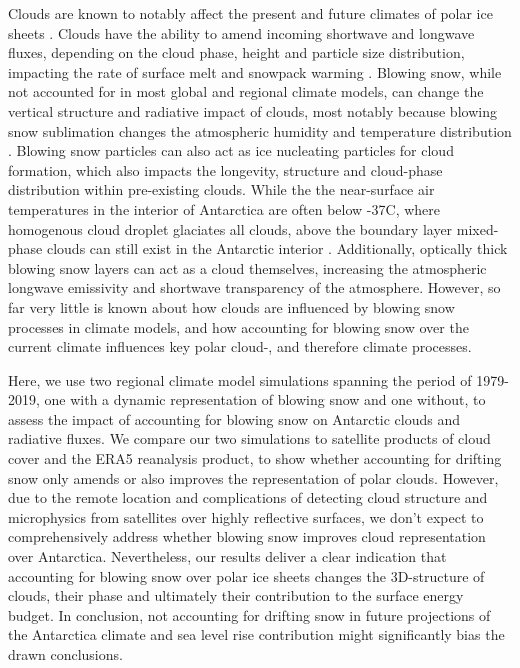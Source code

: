 \documentclass[12pt]{article}
\begin{document}
Clouds are known to notably affect the present and future climates of polar ice sheets \cite{Hofer2017, Hofer2019,VanTricht2016,Izeboud2020,Hahn2019}. Clouds have the ability to amend incoming shortwave and longwave fluxes, depending on the cloud phase, height and particle size distribution, impacting the rate of surface melt and snowpack warming \cite{Gilbert2020,Tan2016,Tan2019}. Blowing snow, while not accounted for in most global and regional climate models, can change the vertical structure and radiative impact of clouds, most notably because blowing snow sublimation changes the atmospheric humidity and temperature distribution \cite{Letoumelin2020, Amory2019, Lenaerts2012a, Lenaerts2012b} . Blowing snow particles can also act as ice nucleating particles for cloud formation, which also impacts the longevity, structure and cloud-phase distribution within pre-existing clouds. While the the near-surface air temperatures in the interior of Antarctica are often below -37\textdegree C, where homogenous cloud droplet glaciates all clouds, above the boundary layer mixed-phase clouds can still exist in the Antarctic interior \cite{Lawson2014}. Additionally, optically thick blowing snow layers can act as a cloud themselves, increasing the atmospheric longwave emissivity and shortwave transparency of the atmosphere. However, so far very little is known about how clouds are influenced by blowing snow processes in climate models, and how accounting for blowing snow over the current climate influences key polar cloud-, and therefore climate processes.


Here, we use two regional climate model simulations spanning the period of 1979-2019, one with a dynamic representation of blowing snow and one without, to assess the impact of accounting for blowing snow on Antarctic clouds and radiative fluxes. We compare our two simulations to satellite products of cloud cover and the ERA5 reanalysis product, to show whether accounting for drifting snow only amends or also improves the representation of polar clouds. However, due to the remote location and complications of detecting cloud structure and microphysics from satellites over highly reflective surfaces, we don’t expect to comprehensively address whether blowing snow improves cloud representation over Antarctica. Nevertheless, our results deliver a clear indication that accounting for blowing snow over polar ice sheets changes the 3D-structure of clouds, their phase and ultimately their contribution to the surface energy budget. In conclusion, not accounting for drifting snow in future projections of the Antarctica climate and sea level rise contribution might significantly bias the drawn conclusions.  
\end{document}

